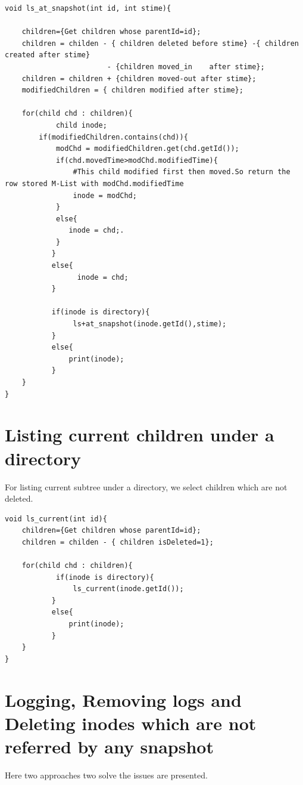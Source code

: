 \begin{verbatim}
void ls_at_snapshot(int id, int stime){

    children={Get children whose parentId=id};
    children = childen - { children deleted before stime} -{ children created after stime} 
                        - {children moved_in 	after stime};
    children = children + {children moved-out after stime};
    modifiedChildren = { children modified after stime};

    for(child chd : children){
    	    child inode;
        if(modifiedChildren.contains(chd)){
            modChd = modifiedChildren.get(chd.getId());
            if(chd.movedTime>modChd.modifiedTime){
                #This child modified first then moved.So return the row stored M-List with modChd.modifiedTime
                inode = modChd;             
            }
            else{
               inode = chd;.
            }
    	   }
    	   else{
    	         inode = chd;
    	   }
    	   
    	   if(inode is directory){
    	        ls+at_snapshot(inode.getId(),stime);
    	   }
    	   else{
    	       print(inode);
    	   }
    }
}

\end{verbatim}

\section{Listing current children under a directory }
For listing current subtree under a directory, we select children which are not deleted.\\
\begin{verbatim}
void ls_current(int id){
    children={Get children whose parentId=id};
    children = childen - { children isDeleted=1}; 

    for(child chd : children){
    	    if(inode is directory){
    	        ls_current(inode.getId());
    	   }
    	   else{
    	       print(inode);
    	   }
    }
}
\end{verbatim}

\section{Logging, Removing logs and Deleting inodes which are not referred by any snapshot}
\label{loggingApproaches}
Here two approaches two solve the issues are presented.
